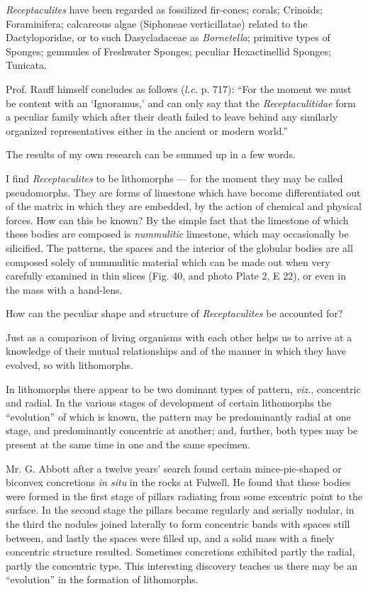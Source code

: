 \documentclass[a4paper, 12pt, oneside]{article}
\begin{document}
\emph{Receptaculites} have been regarded as fossilized fir-cones; corals; Crinoids; Foraminifera; calcareous algae (Siphoneae verticillatae) related to the Dactyloporidae, or to such Dasycladaceae as \emph{Bornetella}; primitive types of Sponges; gemmules of Freshwater Sponges; peculiar Hexactinellid Sponges; Tunicata.

Prof. Rauff himself concludes as follows (\emph{l.c.} p. 717): ``For the moment we must be content with an `Ignoramus,' and can only say that the \emph{Receptaculitidae} form a peculiar family which after their death failed to leave behind any similarly organized representatives either in the ancient or modern world.''

The results of my own research can be summed up in a few words.

I find \emph{Receptaculites} to be lithomorphs --- for the moment they may be called pseudomorphs. They are forms of limestone which have become differentiated out of the matrix in which they are embedded, by the action of chemical and physical forces. How can this be known? By the simple fact that the limestone of which these bodies are composed is \emph{nummulitic} limestone, which may occasionally be silicified. The patterns, the spaces and the interior of the globular bodies are all composed solely of nummulitic material which can be made out when very carefully examined in thin slices (Fig. 40, and photo Plate 2, E 22), or even in the mass with a hand-lens.

How can the peculiar shape and structure of \emph{Receptaculites} be accounted for?

Just as a comparison of living organisms with each other helps us to arrive at a knowledge of their mutual relationships and of the manner in which they have evolved, so with lithomorphs.

In lithomorphs there appear to be two dominant types of pattern, \emph{viz.}, concentric and radial. In the various stages of development of certain lithomorphs the ``evolution'' of which is known, the pattern may be predominantly radial at one stage, and predominantly concentric at another; and, further, both types may be present at the same time in one and the same specimen.

Mr. G. Abbott after a twelve years' search found certain mince-pie-shaped or biconvex concretions \emph{in situ} in the rocks at Fulwell. He found that these bodies were formed in the first stage of pillars radiating from some excentric point to the surface. In the second stage the pillars became regularly and serially nodular, in the third the nodules joined laterally to form concentric bands with spaces still between, and lastly the spaces were filled up, and a solid mass with a finely concentric structure resulted. Sometimes concretions exhibited partly the radial, partly the concentric type. This interesting discovery teaches us there may be an ``evolution'' in the formation of lithomorphs.
\end{document}
